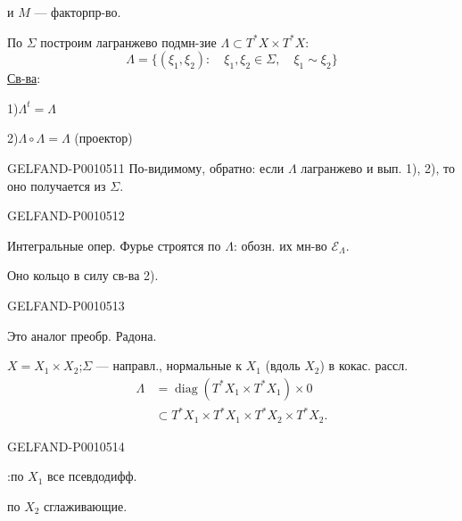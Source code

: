 и $M$ — факторпр-во.

По $\Sigma$ построим лагранжево подмн-зие $\Lambda\subset T^*X\times T^*X$:
\[
\Lambda=\{(\xi_1,\xi_2):\quad\xi_1,\xi_2\in\Sigma,\quad\xi_1\sim\xi_2\}
\]
\underline{Св-ва}:

1)\quad $\Lambda^t=\Lambda$

2)\quad $\Lambda\circ\Lambda=\Lambda$ \qquad (проектор)


\begin{GelfandAdjacentEvidence}{GELFAND-P001051}{1}
По-видимому, обратно: если $\Lambda$ лагранжево и вып. 1), 2), то оно получается из $\Sigma$.
\end{GelfandAdjacentEvidence}
\begin{GelfandAdjacentEvidence}{GELFAND-P001051}{2}


Интегральные опер. Фурье строятся по $\Lambda$: обозн. их мн-во $\mathcal E_\Lambda$.

Оно кольцо в силу св-ва 2).
\end{GelfandAdjacentEvidence}
\begin{GelfandAdjacentEvidence}{GELFAND-P001051}{3}


Это аналог преобр. Радона.

$X=X_1\times X_2$;\quad $\Sigma$ — направл., нормальные к $X_1$ (вдоль $X_2$)
в кокас. рассл.
\[
\begin{aligned}
\Lambda
&=\operatorname{diag}(T^*X_1\times T^*X_1)\times 0\\
&\subset T^*X_1\times T^*X_1\times T^*X_2\times T^*X_2.
\end{aligned}
\]
\end{GelfandAdjacentEvidence}
\begin{GelfandAdjacentEvidence}{GELFAND-P001051}{4}


:\quad по $X_1$ все псевдодифф.

\hspace{5em}по $X_2$ сглаживающие.

\end{GelfandAdjacentEvidence}
